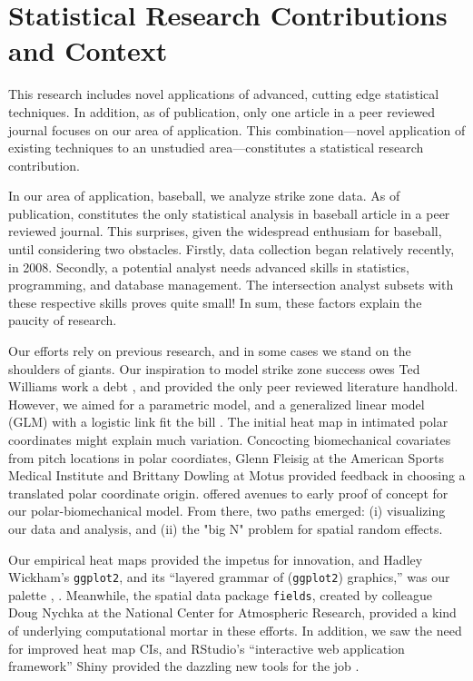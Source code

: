 \section{Statistical Research Contributions and Context}

This research includes novel applications of advanced, cutting edge statistical techniques. In addition, as of publication, only one article in a peer reviewed journal focuses on our area of application. This combination---novel application of existing techniques to an unstudied area---constitutes a statistical research contribution. 

In our area of application, baseball, we analyze strike zone data. As of publication, \cite{Cross2015} constitutes the only statistical analysis in baseball article in a peer reviewed journal. This surprises, given the widespread enthusiam for baseball, until considering two obstacles. Firstly, data collection began relatively recently, in 2008. Secondly, a potential analyst needs advanced skills in statistics, programming, and database management. The intersection analyst subsets with these respective skills proves quite small!  In sum, these factors explain the paucity of research.

Our efforts rely on previous research, and in some cases we stand on the shoulders of giants. Our inspiration to model strike zone success owes  Ted Williams work a debt \cite{Williams1971}, and \cite{Cross2015} provided the only peer reviewed literature handhold. However, we aimed for a parametric model, and a generalized linear model (GLM) with a logistic link fit the bill \citep{Myers2012}. The initial heat map in \cite{Cross2015} intimated polar coordinates might explain much variation. Concocting biomechanical covariates from pitch locations in polar coordiates, Glenn Fleisig at the American Sports Medical Institute \citep{Fleisig2002} and Brittany Dowling at Motus \citep{Dowling2016} provided feedback in choosing a translated polar coordinate origin. \cite{Hosmer2013} offered avenues to early proof of concept for our polar-biomechanical model. From there, two  paths emerged: (i) visualizing our data and analysis, and (ii) the "big N" problem for spatial random effects.

Our empirical heat maps provided the impetus for innovation, and Hadley Wickham's \verb|ggplot2|, and its ``layered grammar of (\verb|ggplot2|) graphics,'' was our palette \citep{Wickham2009}, \citep{Wickham2010}. Meanwhile, the spatial data package \verb|fields|, created by colleague Doug Nychka at the National Center for Atmospheric Research, provided a kind of underlying computational mortar in these efforts.  In addition, we saw the need for improved heat map CIs, and RStudio's ``interactive web application framework'' Shiny provided the dazzling new tools for the job \citep{Shiny}.

